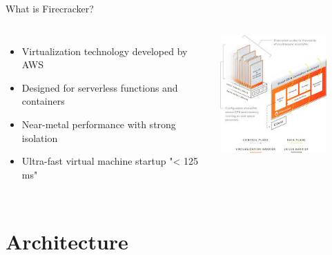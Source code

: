 \documentclass{beamer}
\begin{document}
\begin{frame}{What is Firecracker?}
  \begin{columns}
    \begin{itemize}
      \item Virtualization technology developed by AWS
      \item Designed for serverless functions and containers
      \item Near-metal performance with strong isolation
      \item Ultra-fast virtual machine startup "< 125 ms"
    \end{itemize}
    
    \begin{center}
      \includegraphics[width=0.8\textwidth]{firecracker.jpeg}
    \end{center}
  \end{columns}
\end{frame}

\section{Architecture}
\end{document}
